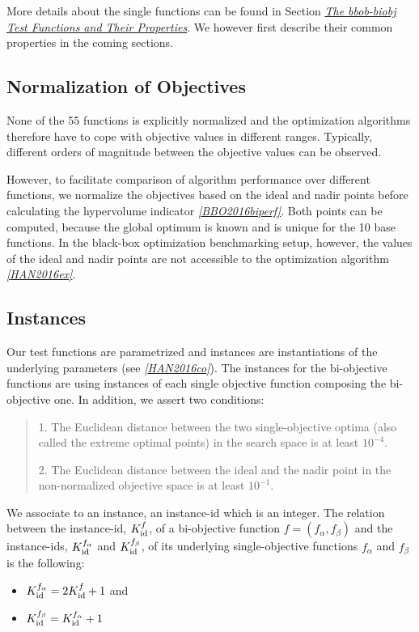 \documentclass[letterpaper,12pt,english]{article}
\begin{document}
More details about the single functions can be found in Section {\hyperref[index:sec\string-test\string-functions]{\emph{The bbob-biobj Test Functions and Their Properties}}}. We however first describe their common properties in the coming sections.


\subsection{Normalization of Objectives}
\label{index:normalization-of-objectives}
None of the 55  functions is explicitly normalized and the
optimization algorithms therefore have to cope with objective values in
different ranges. Typically, different orders of magnitude
between the objective values can be observed.

However, to facilitate comparison of algorithm performance over different functions,
we normalize the objectives based on the ideal and nadir points
before calculating the hypervolume indicator \label{index:id6}{\hyperref[index:bbo2016biperf]{\emph{{[}BBO2016biperf{]}}}}.
Both points can be computed, because the global
optimum is known and is unique for the 10  base functions.
In the black-box optimization benchmarking setup, however, the values of the
ideal and nadir points are not accessible to the optimization algorithm
\label{index:id7}{\hyperref[index:han2016ex]{\emph{{[}HAN2016ex{]}}}}.


\subsection{Instances}
\label{index:instances}
Our test functions are parametrized and instances are instantiations of the
underlying parameters (see \label{index:id8}{\hyperref[index:han2016co]{\emph{{[}HAN2016co{]}}}}). The instances for the bi-objective
functions are using instances of each single objective function composing the
bi-objective one. In addition, we assert two conditions:
\begin{quote}

1. The Euclidean distance between the two single-objective optima (also called the
extreme optimal points) in the search space is at least \(10^{-4}\).

2. The Euclidean distance between the ideal and the nadir point in the non-normalized
objective space is at least \(10^{-1}\).
\end{quote}

We associate to an instance, an instance-id which is an integer. The relation between the
instance-id, \(K^{f}_{\rm id}\), of a bi-objective function \(f = (f_\alpha, f_\beta)\)
and the instance-ids, \(K_{\rm id}^{f_\alpha}\) and \(K_{\rm id}^{f_\beta}\), of its
underlying single-objective functions \(f_\alpha\) and \(f_\beta\) is the following:
\begin{itemize}
\item {} 
\(K_{\rm id}^{f_\alpha} = 2 K^{f}_{\rm id} + 1\) and

\item {} 
\(K_{\rm id}^{f_\beta} = K_{\rm id}^{f_\alpha} + 1\)

\end{itemize}
\end{document}
